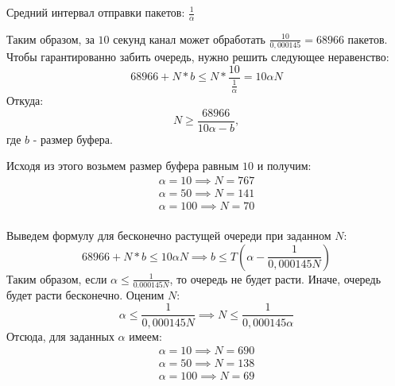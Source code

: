 \documentclass[a4paper, 14pt]{extarticle}
\begin{document}
Средний интервал отправки пакетов: $\frac{1}{\alpha}$

Таким образом, за $10$ секунд канал может обработать $\frac{10}{0,000145} = 68966$ пакетов.
Чтобы гарантированно забить очередь, нужно решить следующее неравенство:
\[68966 + N * b \leq N * \frac{10}{\frac{1}{\alpha}} = 10\alpha N\]
Откуда:
\[N \geq \frac{68966}{10\alpha - b},\]
где $b$ - размер буфера.

Исходя из этого возьмем размер буфера равным $10$ и получим:
\begin{align*}
    \alpha = 10  \implies N = 767 \\
    \alpha = 50  \implies N = 141 \\
    \alpha = 100 \implies N = 70  \\
\end{align*}

Выведем формулу для бесконечно растущей очереди при заданном $N$:
\[68966 + N * b \leq 10\alpha N \implies b \leq T\left(\alpha - \frac{1}{0,000145N}\right)\]
Таким образом, если $\alpha \leq \frac{1}{0.000145N}$, то очередь не будет расти. Иначе, очередь будет расти бесконечно.
Оценим $N$:
\[\alpha \leq \frac{1}{0,000145N} \implies N \leq \frac{1}{0,000145\alpha}\]
Отсюда, для заданных $\alpha$ имеем:
\begin{align*}
\alpha = 10 \implies N = 690 \\
\alpha = 50 \implies N = 138 \\
\alpha = 100 \implies N = 69 \\
\end{align*}
\end{document}

